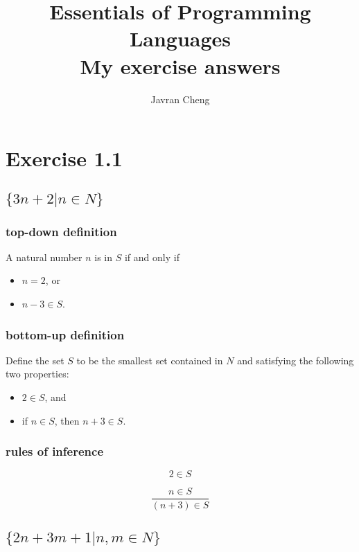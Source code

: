 \documentclass[11pt,a4paper]{article}
\title{Essentials of Programming Languages\\
{\large
My exercise answers}}
\author{Javran Cheng}
\begin{document}
\maketitle

\section{Exercise 1.1}

\subsection{$\{ 3n + 2 | n \in N  \}$}

\subsubsection{top-down definition}

A natural number $n$ is in $S$ if and only if

\begin{itemize}
    \item{$n=2$, or}
    \item{$n-3 \in S$.}
\end{itemize}

\subsubsection{bottom-up definition}

Define the set $S$ to be the smallest set contained in $N$
and satisfying the following two properties:

\begin{itemize}
    \item{$2 \in S$, and}
    \item{if $n \in S$, then $n+3 \in S$.}
\end{itemize}

\subsubsection{rules of inference}

\begin{equation*}
    2 \in S
\end{equation*}

\begin{equation*}
    \frac{n \in S}{(n+3) \in S}
\end{equation*}

\subsection{$\{2n+3m+1|n,m\in N\}$}
\end{document}
